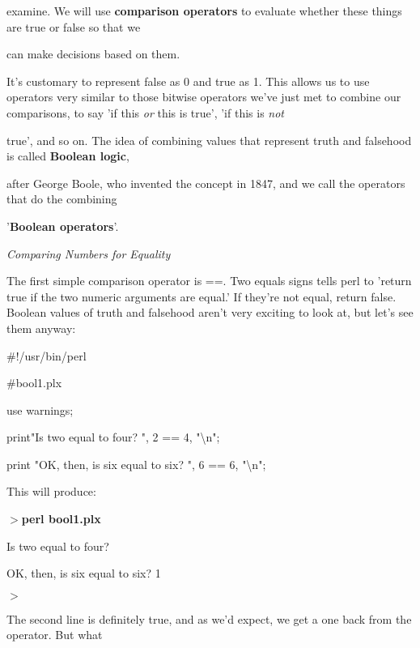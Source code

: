 \documentclass[a4paper,11pt]{book}
\begin{document}
\noindent examine. We will use \textbf{comparison operators }to evaluate whether these things are true or false so that we

\noindent can make decisions based on them.

\noindent 

\noindent It's customary to represent false as 0 and true as 1. This allows us to use operators very similar to those bitwise operators we've just met to combine our comparisons, to say 'if this \textit{or }this is true', 'if this is \textit{not}

\noindent true', and so on. The idea of combining values that represent truth and falsehood is called \textbf{Boolean logic},

\noindent after George Boole, who invented the concept in 1847, and we call the operators that do the combining

\noindent '\textbf{Boolean operators}'.

\noindent 

\noindent \textit{Comparing Numbers for Equality}

\noindent The first simple comparison operator is ==. Two equals signs tells perl to 'return true if the two numeric arguments are equal.' If they're not equal, return false. Boolean values of truth and falsehood aren't very exciting to look at, but let's see them anyway:

\noindent 

\noindent \#!/usr/bin/perl

\noindent \#bool1.plx

\noindent use warnings;

\noindent print"Is two equal to four? ", 2 == 4, "\textbackslash n";

\noindent print "OK, then, is six equal to six? ", 6 == 6, "\textbackslash n";

\noindent 

\noindent This will produce:

\noindent 

\noindent $>$\textbf{perl bool1.plx}

\noindent Is two equal to four?

\noindent OK, then, is six equal to six? 1

\noindent $>$

\noindent 

\noindent 

\noindent The second line is definitely true, and as we'd expect, we get a one back from the operator. But what
\end{document}
